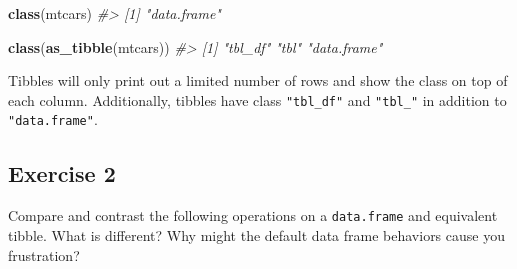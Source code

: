 \documentclass[]{book}
\newenvironment{Shaded}{\begin{snugshade}}{\end{snugshade}}
\newcommand{\CommentTok}[1]{\textcolor[rgb]{0.56,0.35,0.01}{\textit{#1}}}
\newcommand{\DataTypeTok}[1]{\textcolor[rgb]{0.13,0.29,0.53}{#1}}
\newcommand{\DecValTok}[1]{\textcolor[rgb]{0.00,0.00,0.81}{#1}}
\newcommand{\KeywordTok}[1]{\textcolor[rgb]{0.13,0.29,0.53}{\textbf{#1}}}
\newcommand{\NormalTok}[1]{#1}
\newcommand{\OperatorTok}[1]{\textcolor[rgb]{0.81,0.36,0.00}{\textbf{#1}}}
\newcommand{\StringTok}[1]{\textcolor[rgb]{0.31,0.60,0.02}{#1}}
\theoremstyle{plain}
\theoremstyle{remark}
\theoremstyle{definition}
\theoremstyle{definition}
\theoremstyle{definition}
\theoremstyle{remark}
\begin{document}
\begin{Shaded}
\begin{Highlighting}[]
\KeywordTok{class}\NormalTok{(mtcars)}
\CommentTok{#> [1] "data.frame"}
\end{Highlighting}
\end{Shaded}

\begin{Shaded}
\begin{Highlighting}[]
\KeywordTok{class}\NormalTok{(}\KeywordTok{as_tibble}\NormalTok{(mtcars))}
\CommentTok{#> [1] "tbl_df"     "tbl"        "data.frame"}
\end{Highlighting}
\end{Shaded}

Tibbles will only print out a limited number of rows and show the class
on top of each column. Additionally, tibbles have class
\texttt{"tbl\_df"} and \texttt{"tbl\_"} in addition to
\texttt{"data.frame"}.

\hypertarget{exercise-2-17}{%
\subsection{Exercise 2}\label{exercise-2-17}}

Compare and contrast the following operations on a \texttt{data.frame}
and equivalent tibble. What is different? Why might the default data
frame behaviors cause you frustration?

\begin{Shaded}
\end{Shaded}

\begin{Shaded}
\end{Shaded}
\end{document}
